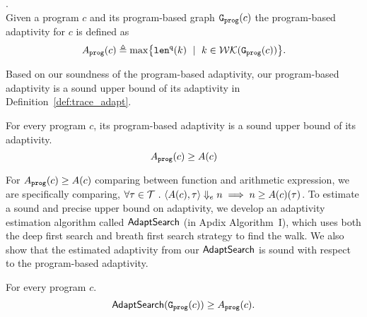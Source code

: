 {\begin{defn}
\end{defn}
%
%
\begin{defn}
.
\label{def:prog_adapt}
\\
{
Given a program ${c}$ and its program-based graph 
$\mathtt{{G_{prog}}}({c})$
%
the program-based adaptivity for $c$ is 
defined as%
\[
\progA({c})
\triangleq \max
\left\{ \qlen(k) \ \mid \  k \in \walks(\progG(c))\right \}.
\]
}
\end{defn}
Based on our soundness of the program-based adaptivity, our program-based adaptivity is a sound upper bound of its adaptivity in Definition~\ref{def:trace_adapt}. 
\begin{thm}
  \label{thm:sound_progadapt}
  For every program $c$, 
  its program-based adaptivity is a sound upper bound of its adaptivity.
    $$  A_{\mathtt{prog}}(c) \geq A(c)$$
\end{thm}
For $A_{\mathtt{prog}}(c) \geq A(c)$ comparing between function and arithmetic expression,
we are specifically comparing, $\forall \mathtt{\tau} \in \mathcal{T} ~.~  
\langle A(c), \mathtt{\tau} \rangle \Downarrow_e n \implies n \geq A(c)(\mathtt{\tau}) $.
To estimate a sound and precise upper bound on adaptivity, we develop an adaptivity estimation algorithm called $\mathsf{AdaptSearch}$ (in Apdix Algorithm~I), which uses both the deep first search and breath first search strategy to find the walk. We also show that the estimated adaptivity from our $\mathsf{AdaptSearch}$ is sound with respect to the program-based adaptivity. 
\begin{thm}
  \label{thm:sound_adaptalg}
  For every program $c$.
    $$\mathsf{AdaptSearch}(\mathtt{{G_{prog}}}({c})) \geq A_{\mathtt{prog}}(c).$$
\end{thm}
}
